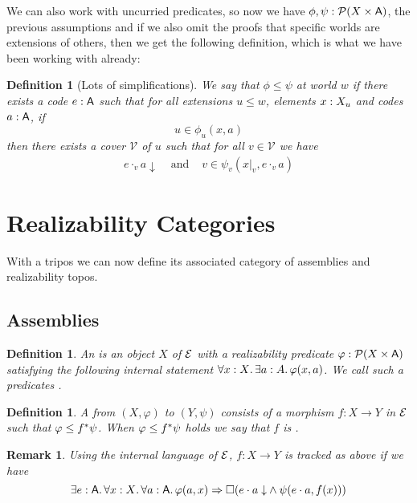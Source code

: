\documentclass[11pt]{article}
\newtheorem{defn}[thrm]{Definition}
\newtheorem{remk}[thrm]{Remark}
\begin{document}
We can also work with uncurried predicates, so now we have
\(\phi,\psi : \mathcal{P}{(X\times\mathsf{A})}\), the previous assumptions and if we
also omit the proofs that specific worlds are extensions of others, then
we get the following definition, which is what we have been working with
already:
%
\begin{defn}[Lots of simplifications]
  We say that \(\phi \leq \psi\) at world \(w\) if there exists a code
  \(e : \mathsf{A}\) such that for all extensions \(u \leq w\), elements
  \(x : X_{u}\) and codes \(a : \mathsf{A}\), if
  \[
    u \in \phi_{u}(x, a)
  \]
  then there exists a cover \(\mathcal{V}\) of \(u\) such that for all \(v \in \mathcal{V}\) we
  have
  \[\begin{array}{ccc}
    e \cdot_{v} a \downarrow &\text{ and }&
    v \in \psi_{v}(x|_{v}, e \cdot_{v} a)
  \end{array}\]
\end{defn}

\section{Realizability Categories}%
\label{sec:realizability-categories}

With a tripos we can now define its associated category of assemblies
and realizability topos.

\subsection{Assemblies}%
\label{sub:assemblies}

\begin{defn}\label{defn:assembly}
  An  is an object \(X\) of \(\mathcal{E}\) with a realizability
  predicate \(\varphi : \mathcal{P}{({X}\times{\ensuremath{\mathsf{A}}})}\) satisfying the following internal
  statement \(\forall{x:X}.\,{\exists{a:A}.\,{\varphi(x,a)}}\).
  We call such a predicates .
\end{defn}

\begin{defn}\label{defn:assembly-morphism}
  A  from \((X,\varphi)\) to
  \((Y,\psi)\) consists of a morphism \(f : X \to Y\) in \(\mathcal{E}\) such that
  \(\varphi \leq {f}^\ast\psi\). When \(\varphi \leq {f}^\ast\psi\) holds
  we say that \(f\) is .
\end{defn}

\begin{remk}
  Using the internal language of \(\mathcal{E}\), \(f : X \to Y\) is tracked as above
  if we have
  \[
    \IExists{e : \A}{
      \IForall{x : \X}{
        \IForall{a : \A}{
          \IImplies%
            {\varphi(a,x)}%
            {\IBox{(
              \IAnd%
              {\ITotal{\IAp{e}{a}}}%
              {\psi(\IAp{e}{a}, f(x))}
            )}}
        }
      }
    }
  \]
\end{remk}
\end{document}
